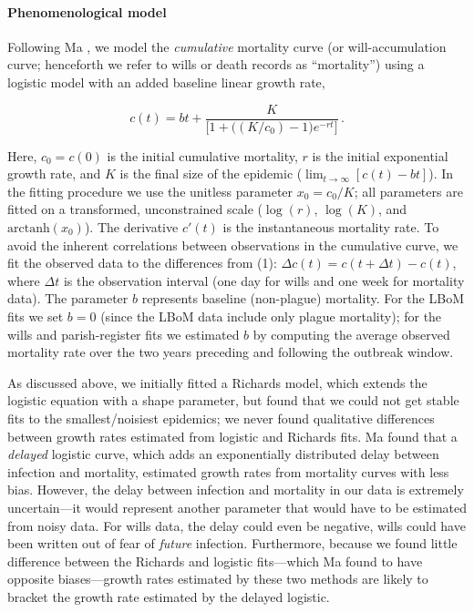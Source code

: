 \hypertarget{phenmod}{}
\paragraph{Phenomenological model}

Following Ma \etal \cite{Ma+14}, we model the \emph{cumulative} mortality curve (or will-accumulation curve; henceforth we refer to wills or death records as ``mortality'') using a logistic model with an added baseline linear growth rate,
%
\begin{linenomath*}
\begin{equation}
c(t) = b t + \frac{K}{\big[1 + \big((K/c_0) - 1\big)e^{-rt}\big]} \,.
\label{E:Richards}
\end{equation}
\end{linenomath*}
%
Here, $c_0=c(0)$ is the initial cumulative mortality, $r$ is the initial exponential growth rate, and $K$ is the final size of the epidemic ($\lim_{t\to\infty}[c(t)-bt]$). In the fitting procedure we use the unitless parameter $x_0=c_0/K$; all parameters are fitted on a transformed, unconstrained scale (\ie $\log(r)$, $\log(K)$, and $\textrm{arctanh}(x_0)$). The derivative $c'(t)$ is the instantaneous mortality rate.  To avoid the inherent correlations between observations in the cumulative curve, we fit the observed data to the differences from (1): \mbox{$\Delta c(t) = c(t+\Delta t)-c(t)$}, where $\Delta t$ is the observation interval (one day for wills and one week for mortality data). The parameter $b$ represents baseline (non-plague) mortality. For the LBoM fits we set $b=0$ (since the LBoM data include only plague mortality); for the wills and parish-register fits we estimated $b$ by computing the average observed mortality rate over the two years preceding and following the outbreak window.

As discussed above, we initially fitted a Richards model, which extends the logistic equation with a shape parameter, but found that we could not get stable fits to the smallest/noisiest epidemics; we never found qualitative differences between growth rates estimated from logistic and Richards fits.  Ma \etal found that a \emph{delayed} logistic curve, which adds an exponentially distributed delay between infection and mortality, estimated growth rates from mortality curves with less bias. However, the delay between infection and mortality in our data is extremely uncertain---it would represent another parameter that would have to be estimated from noisy data. For wills data, the delay could even be negative, \ie wills could have been written out of fear of \emph{future} infection. Furthermore, because we found little difference between the Richards and logistic fits---which Ma \etal found to have opposite biases---growth rates estimated by these two methods are likely to bracket the growth rate estimated by the delayed logistic.


